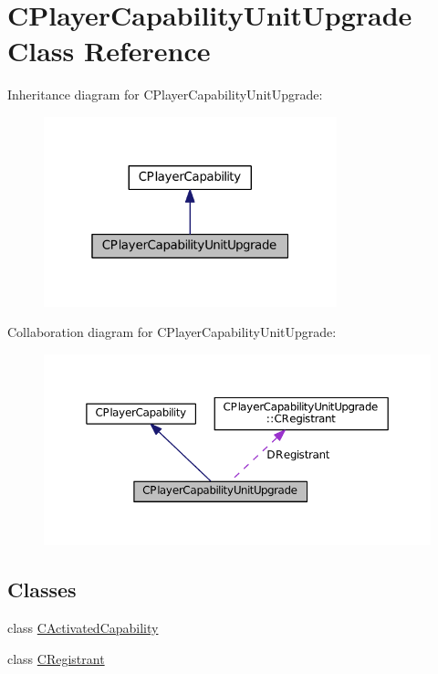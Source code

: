 \hypertarget{classCPlayerCapabilityUnitUpgrade}{}\section{C\+Player\+Capability\+Unit\+Upgrade Class Reference}
\label{classCPlayerCapabilityUnitUpgrade}


Inheritance diagram for C\+Player\+Capability\+Unit\+Upgrade\+:
\nopagebreak
\begin{figure}[H]
\begin{center}
\leavevmode
\includegraphics[width=241pt]{classCPlayerCapabilityUnitUpgrade__inherit__graph}
\end{center}
\end{figure}


Collaboration diagram for C\+Player\+Capability\+Unit\+Upgrade\+:
\nopagebreak
\begin{figure}[H]
\begin{center}
\leavevmode
\includegraphics[width=350pt]{classCPlayerCapabilityUnitUpgrade__coll__graph}
\end{center}
\end{figure}
\subsection*{Classes}
\begin{DoxyCompactItemize}
\item 
class \hyperlink{classCPlayerCapabilityUnitUpgrade_1_1CActivatedCapability}{C\+Activated\+Capability}
\item 
class \hyperlink{classCPlayerCapabilityUnitUpgrade_1_1CRegistrant}{C\+Registrant}
\end{DoxyCompactItemize}
